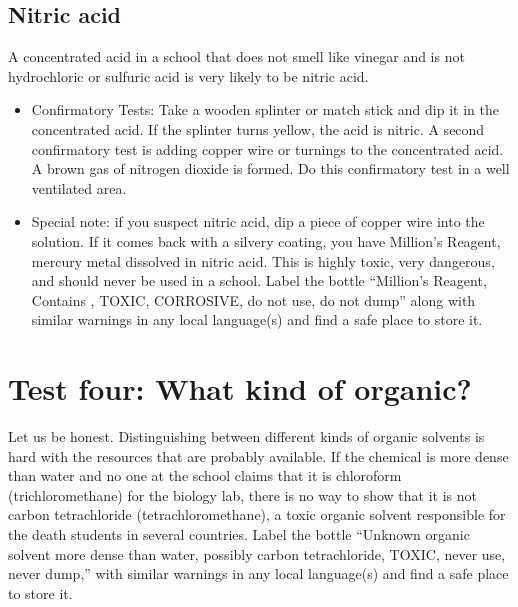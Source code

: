 \subsection{Nitric acid}
A concentrated acid in a school that does not smell like vinegar 
and is not hydrochloric or sulfuric acid is very likely to be nitric acid. 

\begin{itemize}

\item{Confirmatory Tests: Take a wooden splinter 
or match stick and dip it in the concentrated acid. 
If the splinter turns yellow, 
the acid is nitric. 
A second confirmatory test is adding copper wire 
or turnings to the concentrated acid. 
A brown gas of nitrogen dioxide is formed. 
Do this confirmatory test in a well ventilated area.}

\item{Special note: if you suspect nitric acid, 
dip a piece of copper wire into the solution. 
If it comes back with a silvery coating, 
you have Million’s Reagent, 
mercury metal dissolved in nitric acid. 
This is highly toxic, 
very dangerous, 
and should never be used in a school. 
Label the bottle “Million’s Reagent, 
Contains , 
TOXIC, 
CORROSIVE, 
do not use, 
do not dump” along with similar warnings 
in any local language(s) and find a safe place to store it.}

\end{itemize}

\section{Test four: What kind of organic?}
\label{sec:testorganic}
Let us be honest. 
Distinguishing between different kinds of organic solvents 
is hard with the resources that are probably available. 
If the chemical is more dense than water 
and no one at the school claims that it is chloroform 
(trichloromethane) for the biology lab, 
there is no way to show that it is not carbon tetrachloride 
(tetrachloromethane), 
a toxic organic solvent responsible 
for the death students in several countries. 
Label the bottle ``Unknown organic solvent more dense than water, 
possibly carbon tetrachloride, 
TOXIC, 
never use, 
never dump,'' with similar warnings in any local language(s) 
and find a safe place to store it.

